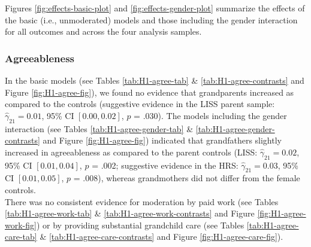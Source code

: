 \documentclass[
  english,
  man,floatsintext]{apa7}
\begin{document}
Figures \ref{fig:effects-basic-plot} and \ref{fig:effects-gender-plot} summarize the effects of the basic (i.e., unmoderated) models and those including the gender interaction for all outcomes and across the four analysis samples.

\hypertarget{agreeableness}{%
\subsubsection{Agreeableness}\label{agreeableness}}

In the basic models (see Tables \ref{tab:H1-agree-tab} \& \ref{tab:H1-agree-contrasts} and Figure \ref{fig:H1-agree-fig}), we found no evidence that grandparents increased as compared to the controls (suggestive evidence in the LISS parent sample: \(\hat{\gamma}_{21} = 0.01\), 95\% CI \([0.00, 0.02]\), \(p\) = .030). The models including the gender interaction (see Tables \ref{tab:H1-agree-gender-tab} \& \ref{tab:H1-agree-gender-contrasts} and Figure \ref{fig:H1-agree-fig}) indicated that grandfathers slightly increased in agreeableness as compared to the parent controls (LISS: \(\hat{\gamma}_{21} = 0.02\), 95\% CI \([0.01, 0.04]\), \(p\) = .002; suggestive evidence in the HRS: \(\hat{\gamma}_{21} = 0.03\), 95\% CI \([0.01, 0.05]\), \(p\) = .008), whereas grandmothers did not differ from the female controls.\\
There was no consistent evidence for moderation by paid work (see Tables \ref{tab:H1-agree-work-tab} \& \ref{tab:H1-agree-work-contrasts} and Figure \ref{fig:H1-agree-work-fig}) or by providing substantial grandchild care (see Tables \ref{tab:H1-agree-care-tab} \& \ref{tab:H1-agree-care-contrasts} and Figure \ref{fig:H1-agree-care-fig}).
\end{document}
